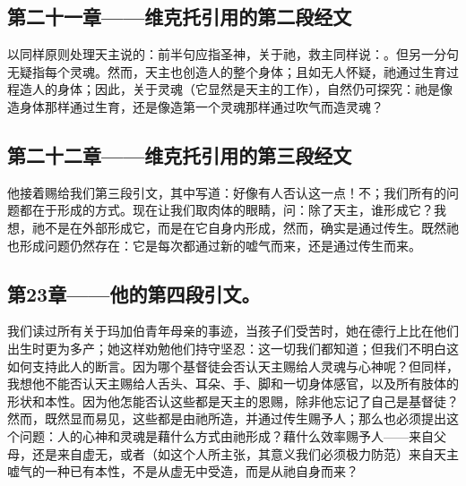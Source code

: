 
\subsection{第二十一章——维克托引用的第二段经文}

以同样原则处理天主说的：前半句应指圣神，关于祂，救主同样说：。但另一分句无疑指每个灵魂。然而，天主也创造人的整个身体；且如无人怀疑，祂通过生育过程造人的身体；因此，关于灵魂（它显然是天主的工作），自然仍可探究：祂是像造身体那样通过生育，还是像造第一个灵魂那样通过吹气而造灵魂？\par


\subsection{第二十二章——维克托引用的第三段经文}

他接着赐给我们第三段引文，其中写道：好像有人否认这一点！不；我们所有的问题都在于形成的方式。现在让我们取肉体的眼睛，问：除了天主，谁形成它？我想，祂不是在外部形成它，而是在它自身内形成，然而，确实是通过传生。既然祂也形成问题仍然存在：它是每次都通过新的嘘气而来，还是通过传生而来。\par


\subsection{第23章——他的第四段引文。}

我们读过所有关于玛加伯青年母亲的事迹，当孩子们受苦时，她在德行上比在他们出生时更为多产；她这样劝勉他们持守坚忍：这一切我们都知道；但我们不明白这如何支持此人的断言。因为哪个基督徒会否认天主赐给人灵魂与心神呢？但同样，我想他不能否认天主赐给人舌头、耳朵、手、脚和一切身体感官，以及所有肢体的形状和本性。因为他怎能否认这些都是天主的恩赐，除非他忘记了自己是基督徒？然而，既然显而易见，这些都是由祂所造，并通过传生赐予人；那么也必须提出这个问题：人的心神和灵魂是藉什么方式由祂形成？藉什么效率赐予人——来自父母，还是来自虚无，或者（如这个人所主张，其意义我们必须极力防范）来自天主嘘气的一种已有本性，不是从虚无中受造，而是从祂自身而来？\par

